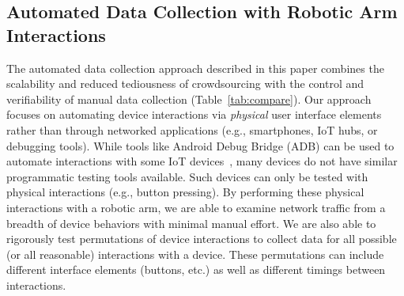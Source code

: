 \subsection{Automated Data Collection with Robotic Arm Interactions}
The automated data collection approach described in this paper combines the scalability and reduced tediousness of crowdsourcing with the control and verifiability of manual data collection (Table~\ref{tab:compare}). 
Our approach focuses on automating device interactions via \textit{physical} user interface elements rather than through networked applications (e.g., smartphones, IoT hubs, or debugging tools). While tools like Android Debug Bridge (ADB) can be used to automate interactions with some IoT devices~\cite{ren2016recon,mohajeri2019watching}, many devices do not have similar programmatic testing tools available. Such devices can only be tested with physical interactions (e.g., button pressing). By performing these physical interactions with a robotic arm, we are able to examine network traffic from a breadth of device behaviors with minimal manual effort. 
We are also able to rigorously test permutations of device interactions to collect data for all possible (or all reasonable) interactions with a device. These permutations can include different interface elements (buttons, etc.) as well as different timings between interactions.